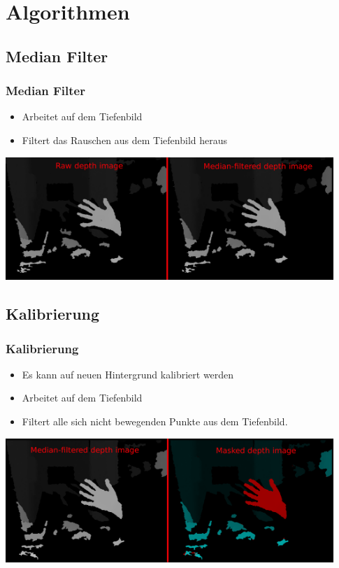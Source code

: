 \documentclass{beamer}
\begin{document}
\section{Algorithmen}

\subsection{Median Filter}
\begin{frame}
\frametitle{Median Filter}
\begin{itemize}
	\item Arbeitet auf dem Tiefenbild
	\item Filtert das Rauschen aus dem Tiefenbild heraus
\end{itemize}
\vspace*{1cm}
\includegraphics[width=12.4cm]{filter1.png}
\end{frame}

\subsection{Kalibrierung}
\begin{frame}
\frametitle{Kalibrierung}
\begin{itemize}
	\item Es kann auf neuen Hintergrund kalibriert werden
	\item Arbeitet auf dem Tiefenbild
	\item Filtert alle sich nicht bewegenden Punkte aus dem Tiefenbild.
\end{itemize}
\includegraphics[width=12.4cm]{filter2.png}
\end{frame}
\end{document}
